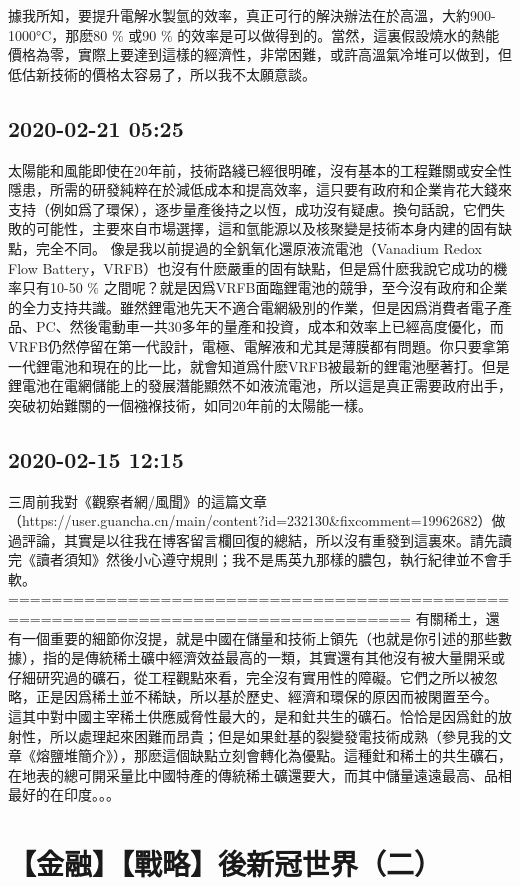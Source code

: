 \documentclass[twocolumn]{ctexart}
\begin{document}
據我所知，要提升電解水製氫的效率，真正可行的解決辦法在於高溫，大約900-1000°C，那麽80 \% 或90 \% 的效率是可以做得到的。當然，這裏假設燒水的熱能價格為零，實際上要達到這樣的經濟性，非常困難，或許高溫氣冷堆可以做到，但低估新技術的價格太容易了，所以我不太願意談。
\subsection*{2020-02-21 05:25}

太陽能和風能即使在20年前，技術路綫已經很明確，沒有基本的工程難關或安全性隱患，所需的研發純粹在於減低成本和提高效率，這只要有政府和企業肯花大錢來支持（例如爲了環保），逐步量產後持之以恆，成功沒有疑慮。換句話說，它們失敗的可能性，主要來自市場選擇，這和氫能源以及核聚變是技術本身内建的固有缺點，完全不同。
像是我以前提過的全釩氧化還原液流電池（Vanadium Redox Flow Battery，VRFB）也沒有什麽嚴重的固有缺點，但是爲什麽我說它成功的機率只有10-50 \% 之間呢？就是因爲VRFB面臨鋰電池的競爭，至今沒有政府和企業的全力支持共識。雖然鋰電池先天不適合電網級別的作業，但是因爲消費者電子產品、PC、然後電動車一共30多年的量產和投資，成本和效率上已經高度優化，而VRFB仍然停留在第一代設計，電極、電解液和尤其是薄膜都有問題。你只要拿第一代鋰電池和現在的比一比，就會知道爲什麽VRFB被最新的鋰電池壓著打。但是鋰電池在電網儲能上的發展潛能顯然不如液流電池，所以這是真正需要政府出手，突破初始難關的一個襁褓技術，如同20年前的太陽能一樣。
\subsection*{2020-02-15 12:15}

三周前我對《觀察者網/風聞》的這篇文章（https://user.guancha.cn/main/content?id=232130\&fixcomment=19962682）做過評論，其實是以往我在博客留言欄回復的總結，所以沒有重發到這裏來。請先讀完《讀者須知》然後小心遵守規則；我不是馬英九那樣的膿包，執行紀律並不會手軟。 
=================================================================================== 
有關稀土，還有一個重要的細節你沒提，就是中國在儲量和技術上領先（也就是你引述的那些數據），指的是傳統稀土礦中經濟效益最高的一類，其實還有其他沒有被大量開采或仔細研究過的礦石，從工程觀點來看，完全沒有實用性的障礙。它們之所以被忽略，正是因爲稀土並不稀缺，所以基於歷史、經濟和環保的原因而被閑置至今。 
這其中對中國主宰稀土供應威脅性最大的，是和釷共生的礦石。恰恰是因爲釷的放射性，所以處理起來困難而昂貴；但是如果釷基的裂變發電技術成熟（參見我的文章《熔鹽堆簡介》），那麽這個缺點立刻會轉化為優點。這種釷和稀土的共生礦石，在地表的總可開采量比中國特產的傳統稀土礦還要大，而其中儲量遠遠最高、品相最好的在印度。。。
\section*{【金融】【戰略】後新冠世界（二）}
\end{document}

